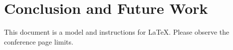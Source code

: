 \section{Conclusion and Future Work}
This document is a model and instructions for \LaTeX.
Please observe the conference page limits. 

